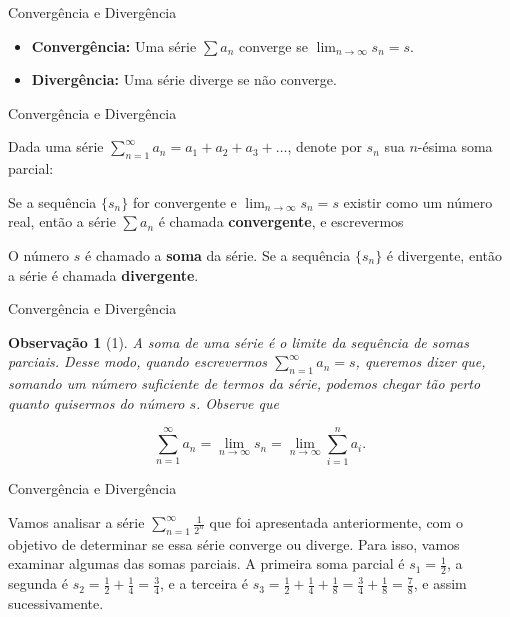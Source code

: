 \documentclass[brazil]{beamer}
\newtheorem{observation}{Observação}\theoremstyle{definition}
\begin{document}
	\begin{frame}{Convergência e Divergência}
		\justifying
		\begin{itemize}
			\item \textbf{Convergência:} Uma série $\displaystyle\sum a_n$ converge se $\displaystyle\lim_{n \to \infty} s_n = s$.
			\item \textbf{Divergência:} Uma série diverge se não converge.
		\end{itemize}
	\end{frame}
	\begin{frame}{Convergência e Divergência}
		\begin{definition}[2]
			Dada uma série $\displaystyle\sum_{n=1}^{\infty} a_n = a_1 + a_2 + a_3 + \dots$, denote por $s_n$ sua $n$-ésima soma parcial:
			
			
			\justifying
			Se a sequência $\{s_n\}$ for convergente e $\displaystyle\lim_{n \to \infty}
			s_n = s$ existir como um número real, então a série $\displaystyle\sum a_n$ é
			chamada \textbf{convergente}, e escrevermos
			
			
			\justifying
			O número $s$ é chamado a \textbf{soma} da série. Se a sequência $\{s_n\}$ é
			divergente, então a série é chamada \textbf{divergente}.
		\end{definition}
	\end{frame}
	\begin{frame}{Convergência e Divergência}
		\begin{observation}[1]
			\justifying
			A soma de uma série é o limite da sequência de somas parciais. Desse modo, quando escrevermos $\displaystyle\sum_{n=1}^{\infty} a_n = s$, queremos dizer que, somando um número suficiente de termos da série, podemos chegar tão perto quanto quisermos do número $s$. Observe que
			
			$$\displaystyle\sum_{n=1}^{\infty} a_n = \lim_{n \to \infty}s_n = \lim_{n \to \infty} \sum_{i=1}^{n} a_i.$$
		\end{observation}
	\end{frame}
	\begin{frame}{Convergência e Divergência}
		
		Vamos analisar a série $\displaystyle\sum_{n=1}^{\infty} \frac{1}{2^n}$ que foi
		apresentada anteriormente, com o objetivo de determinar se essa série converge
		ou diverge. Para isso, vamos examinar algumas das somas parciais. A primeira
		soma parcial é $s_1 = \frac{1}{2}$, a segunda é $s_2 = \frac{1}{2} +
		\frac{1}{4} = \frac{3}{4}$, e a terceira é $s_3 = \frac{1}{2} + \frac{1}{4} +
		\frac{1}{8} = \frac{3}{4} + \frac{1}{8} = \frac{7}{8}$, e assim sucessivamente.
	\end{frame}
\end{document}

